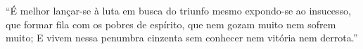 ``É melhor lançar-se à luta em busca do triunfo mesmo expondo-se ao insucesso, que formar fila com os pobres de espírito, que nem gozam muito nem sofrem muito; E vivem nessa penumbra cinzenta sem conhecer nem vitória nem derrota.''



